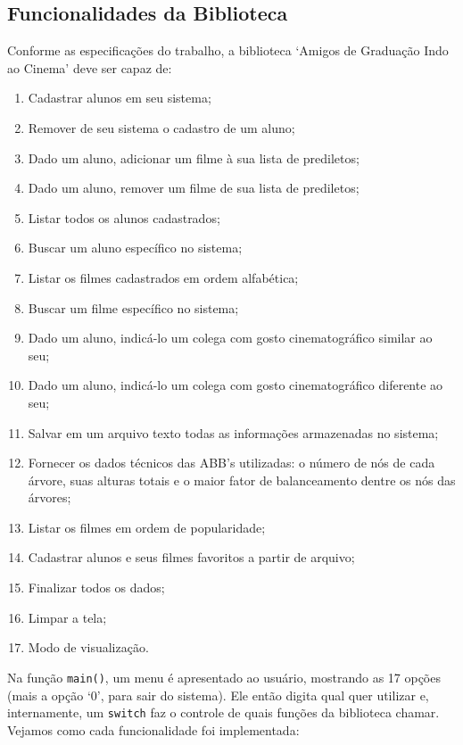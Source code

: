 \documentclass[12pt,a4paper,portuguese]{article}
\begin{document}
    \subsection{Funcionalidades da Biblioteca}
        Conforme as especificações do trabalho, a biblioteca `Amigos de Graduação Indo ao Cinema' deve ser capaz de:
\begin{multicols}{2}
        \begin{enumerate}
            \item Cadastrar alunos em seu sistema;
            \item Remover de seu sistema o cadastro de um aluno;
            \item Dado um aluno, adicionar um filme à sua lista de prediletos;
            \item Dado um aluno, remover um filme de sua lista de prediletos;
            \item Listar todos os alunos cadastrados;
            \item Buscar um aluno específico no sistema;
            \item Listar os filmes cadastrados em ordem alfabética;
            \item Buscar um filme específico no sistema;
            \item Dado um aluno, indicá-lo um colega com gosto cinematográfico similar ao seu;
            \item Dado um aluno, indicá-lo um colega com gosto cinematográfico diferente ao seu;
            \item Salvar em um arquivo texto todas as informações armazenadas no sistema;
            \item Fornecer os dados técnicos das ABB's utilizadas: o número de nós de cada árvore, suas alturas totais e o maior fator de balanceamento dentre os nós das árvores;
            \item Listar os filmes em ordem de popularidade;
            \item Cadastrar alunos e seus filmes favoritos a partir de arquivo;
            \item Finalizar todos os dados;
            \item Limpar a tela;
            \item Modo de visualização. %
        \end{enumerate}
\end{multicols}
        Na função \verb|main()|, um menu é apresentado ao usuário, mostrando as 17 opções (mais a opção `0', para sair do sistema). Ele então digita qual quer utilizar e, internamente, um \verb|switch| faz o controle de quais funções da biblioteca chamar. Vejamos como cada funcionalidade foi implementada:
\end{document}
